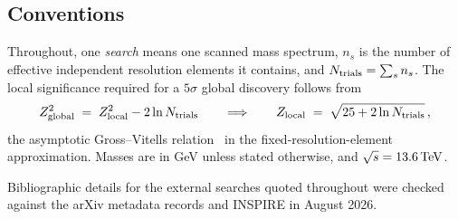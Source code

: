 \subsection{Conventions}

Throughout, one \emph{search} means one scanned mass spectrum, $n_s$ is the number of effective
independent resolution elements it contains, and $N_{\mathrm{trials}} = \sum_s n_s$. The local significance
required for a $5\sigma$ global discovery follows from
\begin{equation}
  Z_{\mathrm{global}}^2 \;=\; Z_{\mathrm{local}}^2 - 2\ln N_{\mathrm{trials}}
  \qquad\Longrightarrow\qquad
  Z_{\mathrm{local}} \;=\; \sqrt{25 + 2\ln N_{\mathrm{trials}}}\,,
  \label{eq:lee}
\end{equation}
the asymptotic Gross--Vitells relation~\cite{grossvitells} in the fixed-resolution-element
approximation. Masses are in GeV unless stated otherwise, and $\sqrt{s} = 13.6\,\mathrm{TeV}$.

Bibliographic details for the external searches quoted throughout were checked against the arXiv
metadata records and INSPIRE in August 2026.
